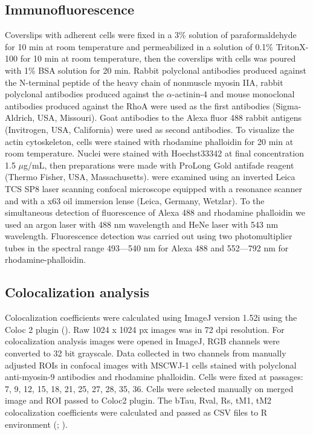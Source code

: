 \documentclass[alpha-refs]{wiley-article}
\begin{document}
\subsection{Immunofluorescence}

Coverslips with adherent cells were fixed in a 3\% solution of paraformaldehyde for 10 min at room temperature and permeabilized in a solution of 0.1\% TritonX-100 for 10 min at room temperature, then the coverslips with cells was poured with 1\% BSA solution for 20 min.
Rabbit polyclonal antibodies produced against the N-terminal peptide of the heavy chain of nonmuscle myosin IIA, rabbit polyclonal antibodies produced against the $\alpha$-actinin-4 and mouse monoclonal antibodies produced against the RhoA were used as the first antibodies (Sigma-Aldrich, USA, Missouri).
Goat antibodies to the Alexa fluor 488 rabbit antigens (Invitrogen, USA, California) were used as second antibodies.
To visualize the actin cytoskeleton, cells were stained with rhodamine phalloidin for 20 min at room temperature.
Nuclei were stained with Hoechst33342 at final concentration 1.5 $\mu$g/mL, then preparations were made with ProLong Gold antifade reagent (Thermo Fisher, USA, Massachusetts).
were examined using an inverted Leica TCS SP8 laser scanning confocal microscope equipped with a resonance scanner and with a x63 oil immersion lense (Leica, Germany, Wetzlar).
To the simultaneous detection of fluorescence of Alexa 488 and rhodamine phalloidin we used an argon laser with 488 nm wavelength  and HeNe laser with 543 nm wavelength.
Fluorescence detection was carried out using two photomultiplier tubes in the spectral range 493---540 nm for Alexa 488 and 552---792 nm for rhodamine-phalloidin.

\subsection{Colocalization analysis}

Colocalization coefficients were calculated using ImageJ version 1.52i using the Coloc 2 plugin (\cite{rueden2017imagej2}).
Raw 1024 x 1024 px images was in 72 dpi resolution.
For colocalization analysis images were opened in ImageJ, RGB channels were converted to 32 bit grayscale.
Data collected in two channels from manually adjusted ROIs in confocal images with MSCWJ-1 cells stained with polyclonal anti-myosin-9 antibodies and rhodamine phalloidin. Cells were fixed at passages: 7, 9, 12, 15, 18, 21, 25, 27, 28, 35, 36.
Cells were selected manually on merged image and ROI passed to Coloc2 plugin.
The bTau, Rval, Rs, tM1, tM2 colocalization coefficients were calculated and passed as CSV files to R environment (\cite{adler2008replicate}; \cite{bergholm2010analysis}).
\end{document}
